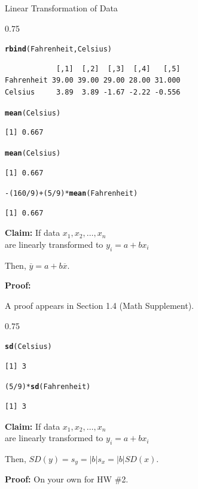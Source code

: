 \documentclass{beamer}\usepackage[]{graphicx}\usepackage[]{color}
\makeatletter
\newcommand{\hlnum}[1]{\textcolor[rgb]{0.2,0.2,0.2}{#1}}%
\newcommand{\hlopt}[1]{\textcolor[rgb]{0.102,0.102,0.102}{#1}}%
\newcommand{\hlstd}[1]{\textcolor[rgb]{0.102,0.102,0.102}{#1}}%
\newcommand{\hlkwd}[1]{\textcolor[rgb]{0.102,0.102,0.102}{\textbf{#1}}}%
\newenvironment{kframe}{%
 \def\at@end@of@kframe{}%
 \ifinner\ifhmode%
  \def\at@end@of@kframe{\end{minipage}}%
  \begin{minipage}{\columnwidth}%
 \fi\fi%
 \def\FrameCommand##1{\hskip\@totalleftmargin \hskip-\fboxsep
 \colorbox{shadecolor}{##1}\hskip-\fboxsep
     \hskip-\linewidth \hskip-\@totalleftmargin \hskip\columnwidth}%
 \MakeFramed {\advance\hsize-\width
   \@totalleftmargin\z@ \linewidth\hsize
   \@setminipage}}%
 {\par\unskip\endMakeFramed%
 \at@end@of@kframe}
\newenvironment{knitrout}{}{} %
\renewenvironment{knitrout}{\begin{spacing}{0.75}\begin{tiny}}{\end{tiny}\end{spacing}}
\newcommand{\xbar}{\overline{x}}
\newcommand{\ybar}{\overline{y}}
\makeatother
\begin{document}
\begin{frame}{Linear Transformation of Data\;\;}
\begin{knitrout}
\begin{kframe}
\begin{alltt}
\hlkwd{rbind}\hlstd{(Fahrenheit, Celsius)}
\end{alltt}
\begin{verbatim}
            [,1]  [,2]  [,3]  [,4]   [,5]
Fahrenheit 39.00 39.00 29.00 28.00 31.000
Celsius     3.89  3.89 -1.67 -2.22 -0.556
\end{verbatim}
\begin{alltt}
\hlkwd{mean}\hlstd{(Celsius)}
\end{alltt}
\begin{verbatim}
[1] 0.667
\end{verbatim}
\begin{alltt}
\hlkwd{mean}\hlstd{(Celsius)}
\end{alltt}
\begin{verbatim}
[1] 0.667
\end{verbatim}
\begin{alltt}
\hlopt{-}\hlstd{(}\hlnum{160}\hlopt{/}\hlnum{9}\hlstd{)} \hlopt{+} \hlstd{(}\hlnum{5}\hlopt{/}\hlnum{9}\hlstd{)} \hlopt{*} \hlkwd{mean}\hlstd{(Fahrenheit)}
\end{alltt}
\begin{verbatim}
[1] 0.667
\end{verbatim}
\end{kframe}
\end{knitrout}


\textbf{Claim:} \;
If data $x_1, x_2,\ldots, x_n$ \\
are
linearly transformed to
$y_i = a + b x_i$
\vskip0.2cm

Then, $\ybar = a + b\xbar$.
\vskip0.5cm

\textbf{Proof:}\;

A proof appears in Section 1.4 (Math Supplement).

\newpage
\begin{knitrout}\small
{}\color{fgcolor}\begin{kframe}
\begin{alltt}
\hlkwd{sd}\hlstd{(Celsius)}
\end{alltt}
\begin{verbatim}
[1] 3
\end{verbatim}
\begin{alltt}
\hlstd{(}\hlnum{5}\hlopt{/}\hlnum{9}\hlstd{)} \hlopt{*} \hlkwd{sd}\hlstd{(Fahrenheit)}
\end{alltt}
\begin{verbatim}
[1] 3
\end{verbatim}
\end{kframe}
\end{knitrout}

\textbf{Claim:} \;
If data $x_1, x_2,\ldots, x_n$ \\
are
linearly transformed to
$y_i = a + b x_i$
\vskip0.2cm

Then, $SD(y) = s_y = |b|s_x = |b|SD(x)$.
\vskip0.5cm

\textbf{Proof:}\;
On your own for HW \#2.



\end{frame}
\end{document}
